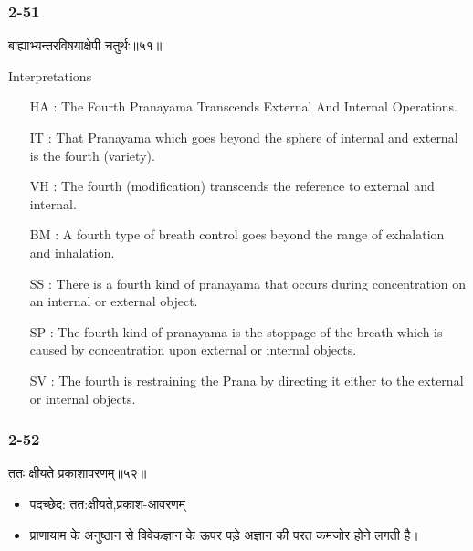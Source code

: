 \begin{frame}[fragile]\frametitle{2-51}
\begin{sanskrit}
बाह्याभ्यन्तरविषयाक्षेपी चतुर्थः॥५१॥
\end{sanskrit}

Interpretations
\begin{itemize}
\item [HA]: The Fourth Pranayama Transcends External And Internal Operations.
\item [IT]: That Pranayama which goes beyond the sphere of internal and external is the fourth (variety).
\item [VH]: The fourth (modification) transcends the reference to external and internal.
\item [BM]: A fourth type of breath control goes beyond the range of exhalation and inhalation.
\item [SS]: There is a fourth kind of pranayama that occurs during concentration on an internal or external object.
\item [SP]: The fourth kind of pranayama is the stoppage of the breath which is caused by concentration upon external or internal objects.
\item [SV]: The fourth is restraining the Prana by directing it either to the external or internal objects. 
\end{itemize}
\end{frame}

\begin{frame}[fragile]\frametitle{2-52}
\begin{sanskrit}
ततः क्षीयते प्रकाशावरणम्॥५२॥
\end{sanskrit}

\begin{itemize}
\item पदच्छेद: तत:क्षीयते,प्रकाश-आवरणम्
\item प्राणायाम के अनुष्ठान से विवेकज्ञान के ऊपर पड़े अज्ञान की परत कमजोर होने लगती है।
\end{itemize}	
	
\end{frame}


